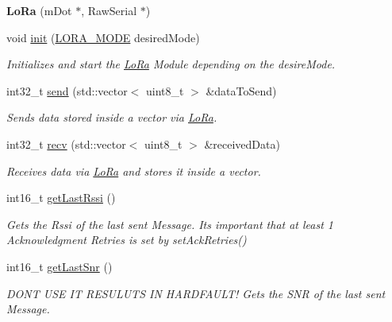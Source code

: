 \begin{DoxyCompactItemize}
\item 
\hypertarget{class_lo_ra_ae32965b22bc4febb5c5e8ea03d22f09a}{}{\bfseries Lo\+Ra} (m\+Dot $\ast$, Raw\+Serial $\ast$)\label{class_lo_ra_ae32965b22bc4febb5c5e8ea03d22f09a}

\item 
void \hyperlink{class_lo_ra_a3b65d9f9801255e027b01e6b60cc3f31}{init} (\hyperlink{_lo_ra_config_8h_a07be112bb46983585d462a9039dc470c}{L\+O\+R\+A\+\_\+\+M\+O\+D\+E} desired\+Mode)
\begin{DoxyCompactList}\small\item\em Initializes and start the \hyperlink{class_lo_ra}{Lo\+Ra} Module depending on the desire\+Mode. \end{DoxyCompactList}\item 
int32\+\_\+t \hyperlink{class_lo_ra_abba159688b78a72f888f2fe623bd249d}{send} (std\+::vector$<$ uint8\+\_\+t $>$ \&data\+To\+Send)
\begin{DoxyCompactList}\small\item\em Sends data stored inside a vector via \hyperlink{class_lo_ra}{Lo\+Ra}. \end{DoxyCompactList}\item 
int32\+\_\+t \hyperlink{class_lo_ra_a01d13acfa1620817b3a1ea40306cf243}{recv} (std\+::vector$<$ uint8\+\_\+t $>$ \&received\+Data)
\begin{DoxyCompactList}\small\item\em Receives data via \hyperlink{class_lo_ra}{Lo\+Ra} and stores it inside a vector. \end{DoxyCompactList}\item 
int16\+\_\+t \hyperlink{class_lo_ra_a76439a227fee90321d4b7c000ef8e160}{get\+Last\+Rssi} ()
\begin{DoxyCompactList}\small\item\em Gets the Rssi of the last sent Message. It\textquotesingle{}s important that at least 1 Acknowledgment Retries is set by set\+Ack\+Retries() \end{DoxyCompactList}\item 
int16\+\_\+t \hyperlink{class_lo_ra_aa7283f0804d10799ddfdb1c3e722bdaf}{get\+Last\+Snr} ()
\begin{DoxyCompactList}\small\item\em D\+O\+N\textquotesingle{}T U\+S\+E I\+T R\+E\+S\+U\+L\+U\+T\+S I\+N H\+A\+R\+D\+F\+A\+U\+L\+T! Gets the S\+N\+R of the last sent Message. \end{DoxyCompactList}\item 

\end{DoxyCompactItemize}
